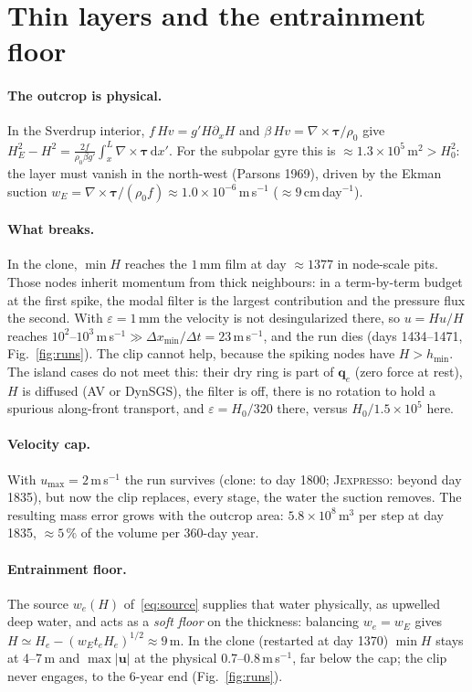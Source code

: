 \documentclass[11pt]{article}
\newcommand{\bq}{\mathbf{q}}
\newcommand{\bu}{\mathbf{u}}
\newcommand{\dd}{\,\mathrm{d}}
\begin{document}
\section{Thin layers and the entrainment floor}
\label{sec:floor}

\paragraph{The outcrop is physical.} In the Sverdrup interior,
$f\,Hv=g'H\partial_xH$ and $\beta\,Hv=\nabla\times\bm{\tau}/\rho_0$ give
$H_E^2-H^2=\frac{2f}{\rho_0\beta g'}\int_x^L\nabla\times\bm\tau\dd x'$. For the
subpolar gyre this is $\approx1.3\times10^5$\,m$^2>H_0^2$: the layer must vanish
in the north-west (Parsons 1969), driven by the Ekman suction
$w_E=\nabla\times\bm\tau/(\rho_0f)\approx1.0\times10^{-6}$\,m\,s$^{-1}$
($\approx9$\,cm\,day$^{-1}$).

\paragraph{What breaks.} In the clone, $\min H$ reaches the $1$\,mm film at
day $\approx1377$ in node-scale pits. Those nodes inherit momentum from thick
neighbours: in a term-by-term budget at the first spike, the modal filter is
the largest contribution and the pressure flux the second. With
$\varepsilon=1$\,mm the velocity is not desingularized there, so
$u=Hu/H$ reaches $10^2$--$10^3$\,m\,s$^{-1}\gg\Delta x_{\min}/\Delta t=23$\,m\,s$^{-1}$,
and the run dies (days 1434--1471, Fig.~\ref{fig:runs}). The clip cannot help,
because the spiking nodes have $H>h_{\min}$. The island cases do not meet
this: their dry ring is part of $\bq_e$ (zero force at rest), $H$ is
diffused (AV or DynSGS), the filter is off, there is no rotation to hold a
spurious along-front transport, and $\varepsilon=H_0/320$ there, versus
$H_0/1.5\times10^5$ here.

\paragraph{Velocity cap.} With $u_{\max}=2$\,m\,s$^{-1}$ the run survives
(clone: to day 1800; \textsc{Jexpresso}: beyond day 1835), but now the clip
replaces, every stage, the water the suction removes. The resulting mass
error grows with the outcrop area: $5.8\times10^8$\,m$^3$ per step at day
1835, $\approx5\,\%$ of the volume per 360-day year.

\paragraph{Entrainment floor.} The source $w_e(H)$ of~\eqref{eq:source}
supplies that water physically, as upwelled deep water, and acts as a
\emph{soft floor} on the thickness: balancing $w_e=w_E$ gives
$H\simeq H_e-(w_Et_eH_e)^{1/2}\approx9$\,m. In the clone (restarted at day
1370) $\min H$ stays at 4--7\,m and $\max|\bu|$ at the physical
0.7--0.8\,m\,s$^{-1}$, far below the cap; the clip never engages, to the
6-year end (Fig.~\ref{fig:runs}).
\end{document}
